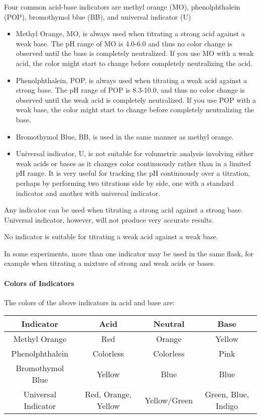 Four common acid-base indicators are methyl orange (MO), phenolphthalein (POP), bromothymol blue (BB), and universal indicator (U)

\begin{itemize}

\item{Methyl Orange, MO, is always used when titrating a strong acid against a weak base. The pH range of MO is 4.0-6.0 and thus no color change is observed until the base is completely neutralized. If you use MO with a weak acid, the color might start to change before completely neutralizing the acid.}

\item{Phenolphthalein, POP, is always used when titrating a weak acid against a strong base. The pH range of POP is 8.3-10.0, and thus no color change is observed until the weak acid is completely neutralized. If you use POP with a weak base, the color might start to change before completely neutralizing the base.}

\item{Bromothymol Blue, BB, is used in the same manner as methyl orange.}

\item{Universal indicator, U, is not suitable for volumetric analysis involving either weak acids or bases as it changes color continuously rather than in a limited pH range. It is very useful for tracking the pH continuously over a titration, perhaps by performing two titrations side by side, one with a standard indicator and another with universal indicator.}

\end{itemize}

Any indicator can be used when titrating a strong acid against a strong base. Universal indicator, however, will not produce very accurate results.

No indicator is suitable for titrating a weak acid against a weak base.

In some experiments, more than one indicator may be used in the same flask, for example when titrating a mixture of strong and weak acids or bases.

\paragraph{Colors of Indicators}
The colors of the above indicators in acid and base are:

\begin{center}
\begin{tabular}{| c | c | c | c |}
\hline
Indicator & Acid & Neutral & Base \\ \hline
Methyl Orange & Red & Orange & Yellow \\ \hline
Phenolphthalein & Colorless & Colorless & Pink \\ \hline
Bromothymol Blue & Yellow & Blue & Blue \\ \hline
Universal Indicator & Red, Orange, Yellow & Yellow/Green & Green, Blue, Indigo  \\
\hline
\end{tabular}
\end{center}

